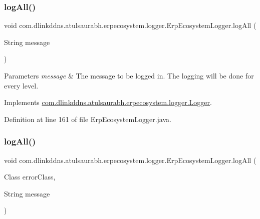 \subsubsection{\texorpdfstring{log\+All()}{logAll()}\hspace{0.1cm}{\footnotesize\ttfamily [1/3]}}
{\footnotesize\ttfamily void com.\+dlinkddns.\+atulsaurabh.\+erpecosystem.\+logger.\+Erp\+Ecosystem\+Logger.\+log\+All (\begin{DoxyParamCaption}\item[{String}]{message }\end{DoxyParamCaption})}


\begin{DoxyParams}{Parameters}
{\em message} & The message to be logged in. The logging will be done for every level. \\
\hline
\end{DoxyParams}


Implements \mbox{\hyperlink{interfacecom_1_1dlinkddns_1_1atulsaurabh_1_1erpecosystem_1_1logger_1_1_logger_a45d119fc284eee3233ca247ec5f92e4c}{com.\+dlinkddns.\+atulsaurabh.\+erpecosystem.\+logger.\+Logger}}.



Definition at line 161 of file Erp\+Ecosystem\+Logger.\+java.

\mbox{\label{classcom_1_1dlinkddns_1_1atulsaurabh_1_1erpecosystem_1_1logger_1_1_erp_ecosystem_logger_a5bea48485386781a9eee8a78c2e2c9be}} 
\subsubsection{\texorpdfstring{log\+All()}{logAll()}\hspace{0.1cm}{\footnotesize\ttfamily [2/3]}}
{\footnotesize\ttfamily void com.\+dlinkddns.\+atulsaurabh.\+erpecosystem.\+logger.\+Erp\+Ecosystem\+Logger.\+log\+All (\begin{DoxyParamCaption}\item[{Class}]{error\+Class,  }\item[{String}]{message }\end{DoxyParamCaption})}


